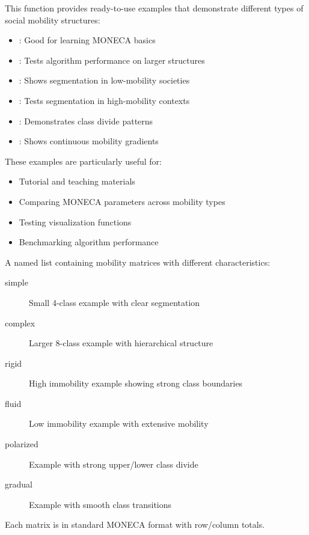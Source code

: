 \documentclass[a4paper]{book}
\begin{document}
\begin{Details}
This function provides ready-to-use examples that demonstrate different types
of social mobility structures:

\begin{itemize}

\item{} : Good for learning MONECA basics
\item{} : Tests algorithm performance on larger structures
\item{} : Shows segmentation in low-mobility societies
\item{} : Tests segmentation in high-mobility contexts
\item{} : Demonstrates class divide patterns
\item{} : Shows continuous mobility gradients

\end{itemize}


These examples are particularly useful for:
\begin{itemize}

\item{} Tutorial and teaching materials
\item{} Comparing MONECA parameters across mobility types
\item{} Testing visualization functions
\item{} Benchmarking algorithm performance

\end{itemize}

\end{Details}
%
\begin{Value}
A named list containing mobility matrices with different characteristics:
\begin{description}

\item[simple] Small 4-class example with clear segmentation
\item[complex] Larger 8-class example with hierarchical structure
\item[rigid] High immobility example showing strong class boundaries
\item[fluid] Low immobility example with extensive mobility
\item[polarized] Example with strong upper/lower class divide
\item[gradual] Example with smooth class transitions

\end{description}

Each matrix is in standard MONECA format with row/column totals.
\end{Value}
\end{document}
